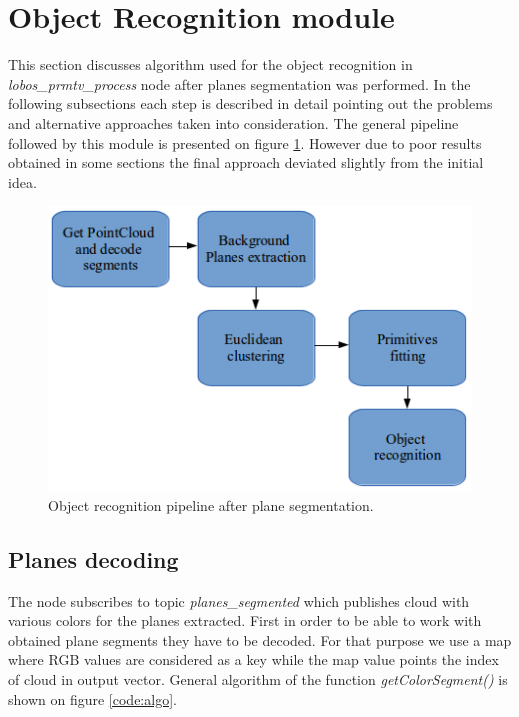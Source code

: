 \documentclass[fontsize=12pt]{article}
\begin{document}


\section{Object Recognition module}
\label{sec:recognition}

This section discusses algorithm used for the object recognition in \emph{lobos\_prmtv\_process} node after planes segmentation was performed. In the following subsections each step is described in detail pointing out the problems and alternative approaches taken into consideration. The general pipeline followed by this module is presented on figure \ref{fig:pipeline}. However due to poor results obtained in some sections the final approach deviated slightly from the initial idea.


\begin{figure}
\begin{center}
  \includegraphics[scale=0.7]{images/pipeline}
  \caption{Object recognition pipeline after plane segmentation.}
  \label{fig:pipeline}
  \end{center}
\end{figure}
\subsection{Planes decoding}
The node subscribes to topic \emph{planes\_segmented} which publishes cloud with various colors for the planes extracted. First in order to be able to work with obtained plane segments they have to be decoded. For that purpose we use a map where RGB values are considered as a key while the map value points the index of cloud in output vector. General algorithm of the function \emph{getColorSegment()} is shown on figure \ref{code:algo}.
\end{document}
